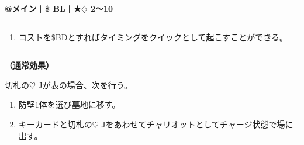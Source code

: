 \documentclass[twocolumn,a5paper,papersize,10pt]{jarticle}
\begin{document}
\begin{tcolorbox}[title={\small\bf【Action】チャリオット召喚}{\scriptsize （召喚）}]

{\scriptsize\bf @メイン }
  {\scriptsize\bf | \$ BL }
  {\scriptsize\bf | ★{\normalsize $\diamondsuit$} 2〜10}

\vspace{1mm} %
\hrule height 0.1mm depth 0mm width 62mm %
\vspace{1mm} %


\vspace{-1zh}%
\begin{enumerate}
\renewcommand{\labelenumi}{※}
\setlength{\leftskip}{-0.3cm}
\setlength{\itemsep}{0pt} %
\setlength{\parskip}{0pt} %

\item コストを\$BDとすればタイミングをクイックとして起こすことができる。

\vspace{-3mm}%
\end{enumerate}
\vspace{-2mm} %
\vspace{1zh}%
\vspace{1mm} %
\hrule height 0.1mm depth 0mm width 62mm %
\vspace{1mm} %

{\bf（通常効果）}

切札の{\normalsize $\heartsuit$} Jが表の場合、次を行う。


\vspace{-1zh}%
\begin{enumerate}
\setlength{\leftskip}{-0.3cm}
\setlength{\parskip}{0pt} %

\item 防壁1体を選び墓地に移す。

\item キーカードと切札の{\normalsize $\heartsuit$} Jをあわせてチャリオットとしてチャージ状態で場に出す。
\vspace{-1zh}%
\end{enumerate}

\vspace{1mm} %
\end{tcolorbox}

\vspace{-1zh}
\end{document}
